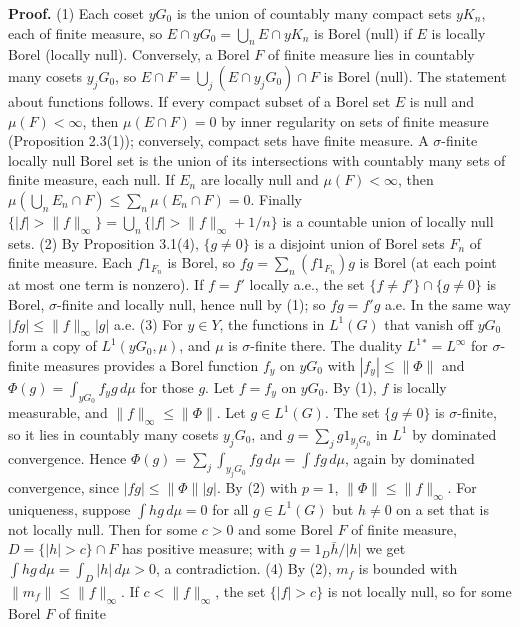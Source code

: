 \documentclass[
  english,
  11pt,
  a4paper,
]{article}
\begin{document}
\textbf{Proof.} (1) Each coset \(yG_0\) is the union of countably many
compact sets \(yK_n\), each of finite measure, so
\(E\cap yG_0=\bigcup_nE\cap yK_n\) is Borel (null) if \(E\) is locally
Borel (locally null). Conversely, a Borel \(F\) of finite measure lies
in countably many cosets \(y_jG_0\), so
\(E\cap F=\bigcup_j(E\cap y_jG_0)\cap F\) is Borel (null). The statement
about functions follows. If every compact subset of a Borel set \(E\) is
null and \(\mu(F)<\infty\), then \(\mu(E\cap F)=0\) by inner regularity
on sets of finite measure (Proposition 2.3(1)); conversely, compact sets
have finite measure. A \(\sigma\)-finite locally null Borel set is the
union of its intersections with countably many sets of finite measure,
each null. If \(E_n\) are locally null and \(\mu(F)<\infty\), then
\(\mu(\bigcup_nE_n\cap F)\leq\sum_n\mu(E_n\cap F)=0\). Finally
\(\{|f|>\|f\|_\infty\}=\bigcup_n\{|f|>\|f\|_\infty+1/n\}\) is a
countable union of locally null sets. (2) By Proposition 3.1(4),
\(\{g\neq0\}\) is a disjoint union of Borel sets \(F_n\) of finite
measure. Each \(f1_{F_n}\) is Borel, so \(fg=\sum_n(f1_{F_n})g\) is
Borel (at each point at most one term is nonzero). If \(f=f'\) locally
a.e., the set \(\{f\neq f'\}\cap\{g\neq0\}\) is Borel, \(\sigma\)-finite
and locally null, hence null by (1); so \(fg=f'g\) a.e. In the same way
\(|fg|\leq\|f\|_\infty|g|\) a.e. (3) For \(y\in Y\), the functions in
\(L^1(G)\) that vanish off \(yG_0\) form a copy of \(L^1(yG_0,\mu)\),
and \(\mu\) is \(\sigma\)-finite there. The duality \(L^1{}^*=L^\infty\)
for \(\sigma\)-finite measures provides a Borel function \(f_y\) on
\(yG_0\) with \(|f_y|\leq\|\Phi\|\) and
\(\Phi(g)=\int_{yG_0}f_yg\,d\mu\) for those \(g\). Let \(f=f_y\) on
\(yG_0\). By (1), \(f\) is locally measurable, and
\(\|f\|_\infty\leq\|\Phi\|\). Let \(g\in L^1(G)\). The set
\(\{g\neq0\}\) is \(\sigma\)-finite, so it lies in countably many cosets
\(y_jG_0\), and \(g=\sum_jg1_{y_jG_0}\) in \(L^1\) by dominated
convergence. Hence
\(\Phi(g)=\sum_j\int_{y_jG_0}fg\,d\mu=\int fg\,d\mu\), again by
dominated convergence, since \(|fg|\leq\|\Phi\||g|\). By (2) with
\(p=1\), \(\|\Phi\|\leq\|f\|_\infty\). For uniqueness, suppose
\(\int hg\,d\mu=0\) for all \(g\in L^1(G)\) but \(h\neq0\) on a set that
is not locally null. Then for some \(c>0\) and some Borel \(F\) of
finite measure, \(D=\{|h|>c\}\cap F\) has positive measure; with
\(g=1_D\bar h/|h|\) we get \(\int hg\,d\mu=\int_D|h|\,d\mu>0\), a
contradiction. (4) By (2), \(m_f\) is bounded with
\(\|m_f\|\leq\|f\|_\infty\). If \(c<\|f\|_\infty\), the set
\(\{|f|>c\}\) is not locally null, so for some Borel \(F\) of finite
\end{document}

